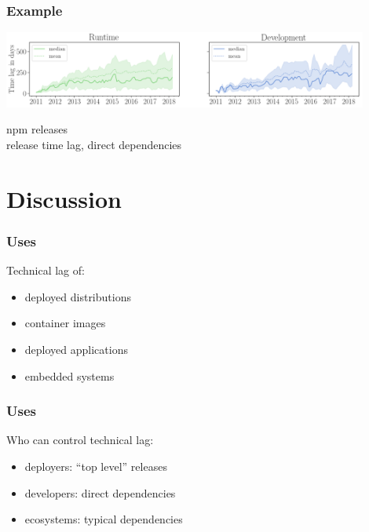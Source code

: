 \documentclass[17pt,aspectratio=169,hyperref=pdfusetitle]{beamer}
\begin{document}
\begin{frame}[fragile]
  \frametitle{Example}

  \includegraphics[width=12cm]{figs/npm-time-lag.png}

  npm releases \\
  release time lag, direct dependencies \\

\end{frame}

\section{Discussion}

\begin{frame}[fragile]
  \frametitle{Uses}

  Technical lag of:

  \begin{itemize}
  \item deployed distributions
  \item container images
  \item deployed applications
  \item embedded systems
  \end{itemize}
  
\end{frame}

\begin{frame}[fragile]
  \frametitle{Uses}

  Who can control technical lag:

  \begin{itemize}
  \item deployers: ``top level'' releases
  \item developers: direct dependencies
  \item ecosystems: typical dependencies
  \end{itemize}
  
\end{frame}
\end{document}
